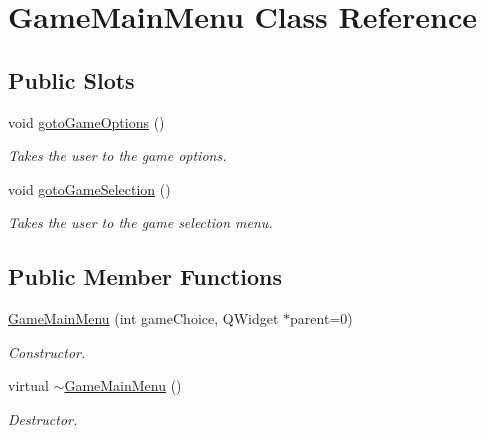 \hypertarget{classGameMainMenu}{\section{\-Game\-Main\-Menu \-Class \-Reference}
\label{classGameMainMenu}
}
\subsection*{\-Public \-Slots}
\begin{DoxyCompactItemize}
\item 
void \hyperlink{classGameMainMenu_a9a8468b4b674f55fcc099a6ec6c37864}{goto\-Game\-Options} ()
\begin{DoxyCompactList}\small\item\em \-Takes the user to the game options. \end{DoxyCompactList}\item 
void \hyperlink{classGameMainMenu_aa83c655f647651d4cc51bbe7e42f85ea}{goto\-Game\-Selection} ()
\begin{DoxyCompactList}\small\item\em \-Takes the user to the game selection menu. \end{DoxyCompactList}\end{DoxyCompactItemize}
\subsection*{\-Public \-Member \-Functions}
\begin{DoxyCompactItemize}
\item 
\hyperlink{classGameMainMenu_a5d9574291780a50f447fe07af11f2dff}{\-Game\-Main\-Menu} (int game\-Choice, \-Q\-Widget $\ast$parent=0)
\begin{DoxyCompactList}\small\item\em \-Constructor. \end{DoxyCompactList}\item 
virtual \hyperlink{classGameMainMenu_a328d428d665c0fd2efcacc0a164d5042}{$\sim$\-Game\-Main\-Menu} ()
\begin{DoxyCompactList}\small\item\em \-Destructor. \end{DoxyCompactList}\end{DoxyCompactItemize}


